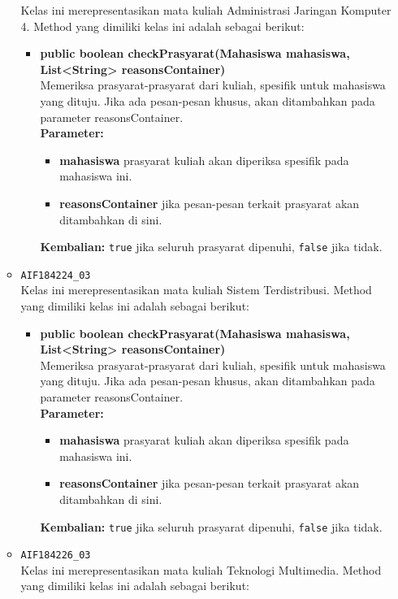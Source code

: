 \begin{enumerate}
\begin{itemize}
		Kelas ini merepresentasikan mata kuliah Administrasi Jaringan Komputer 4. Method yang dimiliki kelas ini adalah sebagai berikut: 
		\begin{itemize}
			\item \textbf{public boolean checkPrasyarat(Mahasiswa mahasiswa, List<String> reasonsContainer)}\\
			Memeriksa prasyarat-prasyarat dari kuliah, spesifik untuk mahasiswa yang dituju. Jika ada pesan-pesan khusus, akan ditambahkan pada parameter reasonsContainer.\\
			\textbf{Parameter:}
			\begin{itemize}
				\item \textbf{mahasiswa} prasyarat kuliah akan diperiksa spesifik pada mahasiswa ini.
				\item \textbf{reasonsContainer} jika pesan-pesan terkait prasyarat akan ditambahkan di sini.
			\end{itemize}
			\textbf{Kembalian:} \texttt{true} jika seluruh prasyarat dipenuhi, \texttt{false} jika tidak.
		\end{itemize}
		\item \texttt{AIF184224\_03} \\
		Kelas ini merepresentasikan mata kuliah Sistem Terdistribusi. Method yang dimiliki kelas ini adalah sebagai berikut: 
		\begin{itemize}
			\item \textbf{public boolean checkPrasyarat(Mahasiswa mahasiswa, List<String> reasonsContainer)}\\
			Memeriksa prasyarat-prasyarat dari kuliah, spesifik untuk mahasiswa yang dituju. Jika ada pesan-pesan khusus, akan ditambahkan pada parameter reasonsContainer.\\
			\textbf{Parameter:}
			\begin{itemize}
				\item \textbf{mahasiswa} prasyarat kuliah akan diperiksa spesifik pada mahasiswa ini.
				\item \textbf{reasonsContainer} jika pesan-pesan terkait prasyarat akan ditambahkan di sini.
			\end{itemize}
			\textbf{Kembalian:} \texttt{true} jika seluruh prasyarat dipenuhi, \texttt{false} jika tidak.
		\end{itemize}
		\item \texttt{AIF184226\_03} \\
		Kelas ini merepresentasikan mata kuliah Teknologi Multimedia. Method yang dimiliki kelas ini adalah sebagai berikut: 

\end{itemize}
\end{enumerate}
